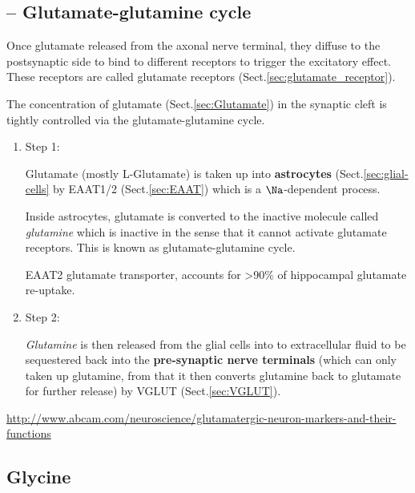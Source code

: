 \subsection{-- Glutamate-glutamine cycle}
\label{sec:glutamate-glutamine-cycle}

Once glutamate released from the axonal nerve terminal, they diffuse to the
postsynaptic side to bind to different receptors to trigger the excitatory
effect. These receptors are called glutamate receptors
(Sect.\ref{sec:glutamate_receptor}).

The concentration of glutamate (Sect.\ref{sec:Glutamate}) in the synaptic cleft
is tightly controlled via the glutamate-glutamine cycle.

\begin{enumerate}

  \item Step 1:
  
Glutamate (mostly L-Glutamate) is taken up into {\bf astrocytes}
(Sect.\ref{sec:glial-cells} by EAAT1/2 (Sect.\ref{sec:EAAT}) which is a
$\Na$-dependent process.

Inside astrocytes, glutamate is converted to the inactive molecule called {\it
glutamine} which is inactive in the sense that it cannot activate glutamate
receptors. This is known as glutamate-glutamine cycle.

EAAT2 glutamate transporter, accounts for >90\% of hippocampal glutamate
re-uptake.

  \item Step 2:

{\it Glutamine}  is then released from the glial cells into to extracellular
fluid to be sequestered back into the {\bf pre-synaptic nerve terminals} (which
can only taken up glutamine, from that it then converts glutamine back to
glutamate for further release) by VGLUT (Sect.\ref{sec:VGLUT}).
\end{enumerate}
 


\url{http://www.abcam.com/neuroscience/glutamatergic-neuron-markers-and-their-functions}




\subsection{Glycine}
\label{sec:Glycine}

